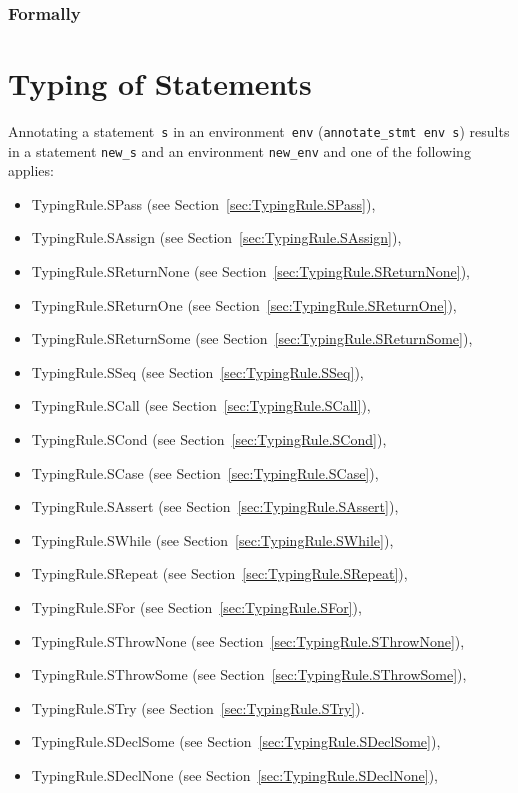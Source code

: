 \documentclass{book}
\begin{document}
\begin{emptyformal}
    \subsection{Formally}
\end{emptyformal}


\chapter{Typing of Statements}
Annotating a statement~\texttt{s} in an environment~\texttt{env}
(\texttt{annotate\_stmt env s}) results in a statement \texttt{new\_s} and an
environment \texttt{new\_env} and one of the following applies:
\begin{itemize}
\item TypingRule.SPass (see Section~\ref{sec:TypingRule.SPass}),
\item TypingRule.SAssign (see Section~\ref{sec:TypingRule.SAssign}),
\item TypingRule.SReturnNone (see Section~\ref{sec:TypingRule.SReturnNone}),
\item TypingRule.SReturnOne (see Section~\ref{sec:TypingRule.SReturnOne}),
\item TypingRule.SReturnSome (see Section~\ref{sec:TypingRule.SReturnSome}),
\item TypingRule.SSeq (see Section~\ref{sec:TypingRule.SSeq}),
\item TypingRule.SCall (see Section~\ref{sec:TypingRule.SCall}),
\item TypingRule.SCond (see Section~\ref{sec:TypingRule.SCond}),
\item TypingRule.SCase (see Section~\ref{sec:TypingRule.SCase}),
\item TypingRule.SAssert (see Section~\ref{sec:TypingRule.SAssert}),
\item TypingRule.SWhile (see Section~\ref{sec:TypingRule.SWhile}),
\item TypingRule.SRepeat (see Section~\ref{sec:TypingRule.SRepeat}),
\item TypingRule.SFor (see Section~\ref{sec:TypingRule.SFor}),
\item TypingRule.SThrowNone (see Section~\ref{sec:TypingRule.SThrowNone}),
\item TypingRule.SThrowSome (see Section~\ref{sec:TypingRule.SThrowSome}),
\item TypingRule.STry (see Section~\ref{sec:TypingRule.STry}).
\item TypingRule.SDeclSome (see Section~\ref{sec:TypingRule.SDeclSome}),
\item TypingRule.SDeclNone (see Section~\ref{sec:TypingRule.SDeclNone}),
\end{itemize}
\end{document}
